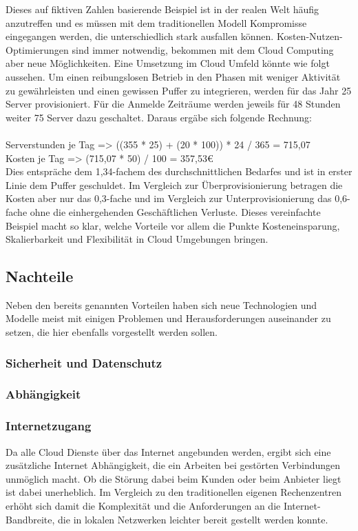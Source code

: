 Dieses auf fiktiven Zahlen basierende Beispiel ist in der realen Welt häufig anzutreffen und es müssen mit dem traditionellen Modell Kompromisse eingegangen werden, die unterschiedlich stark ausfallen können. Kosten-Nutzen-Optimierungen sind immer notwendig, bekommen mit dem Cloud Computing aber neue Möglichkeiten. Eine Umsetzung im Cloud Umfeld könnte wie folgt aussehen. Um einen reibungslosen Betrieb in den Phasen mit weniger Aktivität zu gewährleisten und einen gewissen Puffer zu integrieren, werden für das Jahr 25 Server provisioniert. Für die Anmelde Zeiträume werden jeweils für 48 Stunden weiter 75 Server dazu geschaltet. Daraus ergäbe sich folgende Rechnung:
\\
\\
Serverstunden je Tag => ((355 * 25) + (20 * 100)) * 24 / 365 = 715,07 \\
Kosten je Tag => (715,07 * 50) / 100 = 357,53€ \\

Dies entspräche dem 1,34-fachem des durchschnittlichen Bedarfes und ist in erster Linie dem Puffer geschuldet. Im Vergleich zur Überprovisionierung betragen die Kosten aber nur das 0,3-fache und im Vergleich zur Unterprovisionierung das 0,6-fache ohne die einhergehenden Geschäftlichen Verluste.
Dieses vereinfachte Beispiel macht so klar, welche Vorteile vor allem die Punkte Kosteneinsparung, Skalierbarkeit und Flexibilität in Cloud Umgebungen bringen.

\subsection{Nachteile}
Neben den bereits genannten Vorteilen haben sich neue Technologien und Modelle meist mit einigen Problemen und Herausforderungen auseinander zu setzen, die hier ebenfalls vorgestellt werden sollen.
\subsubsection{Sicherheit und Datenschutz}

\subsubsection{Abhängigkeit}

\subsubsection{Internetzugang}
Da alle Cloud Dienste über das Internet angebunden werden, ergibt sich eine zusätzliche Internet Abhängigkeit, die ein Arbeiten bei gestörten Verbindungen unmöglich macht. Ob die Störung dabei beim Kunden oder beim Anbieter liegt ist dabei unerheblich. Im Vergleich zu den traditionellen eigenen Rechenzentren erhöht sich damit die Komplexität und die Anforderungen an die Internet-Bandbreite, die in lokalen Netzwerken leichter bereit gestellt werden konnte.
